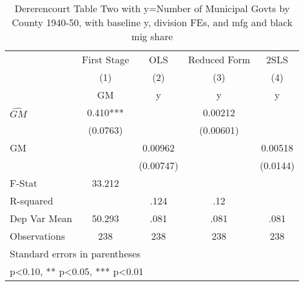 \begin{table}[htbp]\centering
\def\sym#1{\ifmmode^{#1}\else\(^{#1}\)\fi}
\caption{Dererencourt Table Two with y=Number of Municipal Govts by County 1940-50, with baseline y, division FEs, and mfg and black mig share}
\begin{tabular}{l*{4}{c}}
\toprule
                    & First Stage   &         OLS   &Reduced Form   &        2SLS   \\
                    &\multicolumn{1}{c}{(1)}&\multicolumn{1}{c}{(2)}&\multicolumn{1}{c}{(3)}&\multicolumn{1}{c}{(4)}\\
                    &\multicolumn{1}{c}{GM}&\multicolumn{1}{c}{y}&\multicolumn{1}{c}{y}&\multicolumn{1}{c}{y}\\
\midrule
$\hat{GM}$          &       0.410***&               &     0.00212   &               \\
                    &    (0.0763)   &               &   (0.00601)   &               \\
\addlinespace
GM                  &               &     0.00962   &               &     0.00518   \\
                    &               &   (0.00747)   &               &    (0.0144)   \\
\midrule
F-Stat              &      33.212   &               &               &               \\
R-squared           &               &        .124   &         .12   &               \\
Dep Var Mean        &      50.293   &        .081   &        .081   &        .081   \\
Observations        &         238   &         238   &         238   &         238   \\
\bottomrule
\multicolumn{5}{l}{\footnotesize Standard errors in parentheses}\\
\multicolumn{5}{l}{\footnotesize * p<0.10, ** p<0.05, *** p<0.01}\\
\end{tabular}
\end{table}
